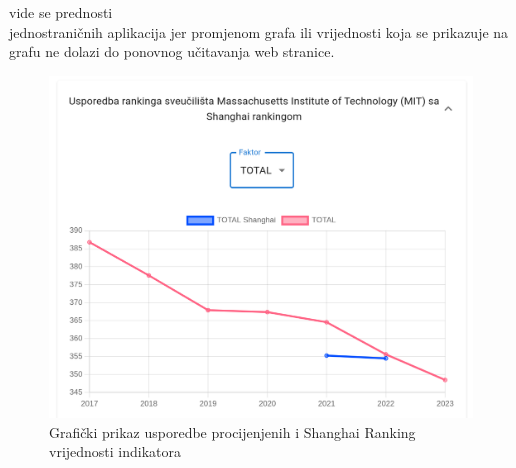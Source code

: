 \documentclass[times, utf8, zavrsni]{fer}
\begin{document}
vide se prednosti \\jednostraničnih aplikacija jer promjenom grafa ili vrijednosti koja se prikazuje na grafu ne dolazi do ponovnog 
učitavanja web stranice.
\begin{figure}[htb]
    \centering
       \includegraphics[scale=0.19]{uni4.png} 
       \caption{Grafički prikaz usporedbe procijenjenih i Shanghai Ranking vrijednosti indikatora}
       \label{fig:uni4}
       \end{figure} 
       \FloatBarrier
\end{document}
